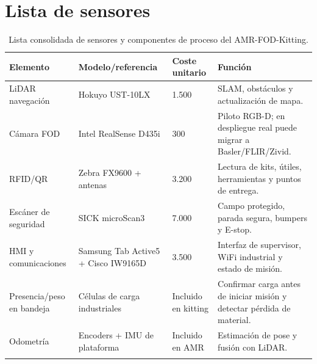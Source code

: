 \section{Lista de sensores}

\begin{longtable}{P{0.22\textwidth}P{0.24\textwidth}P{0.18\textwidth}P{0.26\textwidth}}
\toprule
Elemento & Modelo/referencia & Coste unitario & Función\\
\midrule
\endhead
LiDAR navegación & Hokuyo UST-10LX & 1.500 \texteuro{} & SLAM, obstáculos y actualización de mapa.\\
Cámara FOD & Intel RealSense D435i & 300 \texteuro{} & Piloto RGB-D; en despliegue real puede migrar a Basler/FLIR/Zivid.\\
RFID/QR & Zebra FX9600 + antenas & 3.200 \texteuro{} & Lectura de kits, útiles, herramientas y puntos de entrega.\\
Escáner de seguridad & SICK microScan3 & 7.000 \texteuro{} & Campo protegido, parada segura, bumpers y E-stop.\\
HMI y comunicaciones & Samsung Tab Active5 + Cisco IW9165D & 3.500 \texteuro{} & Interfaz de supervisor, WiFi industrial y estado de misión.\\
Presencia/peso en bandeja & Células de carga industriales & Incluido en kitting & Confirmar carga antes de iniciar misión y detectar pérdida de material.\\
Odometría & Encoders + IMU de plataforma & Incluido en AMR & Estimación de pose y fusión con LiDAR.\\
\bottomrule
\caption{Lista consolidada de sensores y componentes de proceso del AMR-FOD-Kitting.}
\label{tab:anexo-sensores}
\end{longtable}

